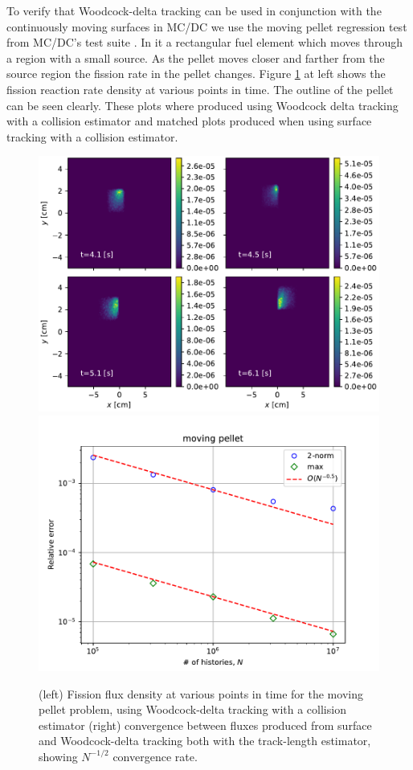 To verify that Woodcock-delta tracking can be used in conjunction with the continuously moving surfaces in MC/DC we use the moving pellet regression test from MC/DC's test suite \cite{morgan_monte_2024}.
In it a rectangular fuel element which moves through a region with a small source.
As the pellet moves closer and farther from the source region the fission rate in the pellet changes.
Figure \ref{fig:moving_pellet} at left shows the fission reaction rate density at various points in time.
The outline of the pellet can be seen clearly.
These plots where produced using Woodcock delta tracking with a collision estimator and matched plots produced when using surface tracking with a collision estimator.

\begin{figure}
    \centering
    \includegraphics[width=0.49\linewidth]{figures/delta_figs/verification/moving_pellet_plot.pdf}
    \includegraphics[width=0.49\linewidth]{figures/delta_figs/verification/moving_pellet.pdf}
    \caption{(left) Fission flux density at various points in time for the moving pellet problem, using Woodcock-delta tracking with a collision estimator (right) convergence between fluxes produced from surface and Woodcock-delta tracking both with the track-length estimator, showing $N^{-1/2}$ convergence rate.}
    \label{fig:moving_pellet}
\end{figure}

